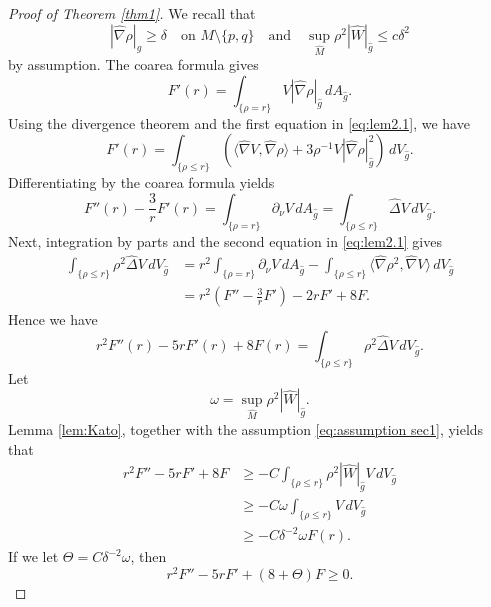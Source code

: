 \documentclass[10pt,a4paper]{amsart}
\newcommand{\da}{\,dA_{\widehat{g}}}
\newcommand{\dv}{\,dV_{\widehat{g}}}
\newcommand{\hd}{\widehat{\Delta}}
\newcommand{\hg}{\widehat{g}}
\newcommand{\hm}{\widehat{M}}
\newcommand{\hn}{\widehat{\nabla}}
\newcommand{\hw}{\widehat{W}}
\newcommand{\ls}{\{\rho=r\}}
\newcommand{\sls}{\{\rho\le r\}}
\begin{document}
\begin{proof}[Proof of Theorem \ref{thm1}] We recall that
\begin{equation*}
|\hn\rho|_{\hg}\ge\delta\quad\text{on $M\setminus\{p,q\}$}\quad \text{and}\quad \sup_{\hm}\rho^2|\hw|_{\hg}\le c\delta^2
\end{equation*} by assumption. The coarea formula gives 
\begin{equation*}
F'(r)=\int_{\ls}V|\hn\rho|_{\hg}\da.
\end{equation*}
Using the divergence theorem and the first equation in \eqref{eq:lem2.1}, we have
\begin{equation*}
F'(r)=\int_{\sls}\left(\langle\hn V,\hn\rho\rangle+3\rho^{-1}V|\hn\rho|^2_{\hg}\right)\dv.
\end{equation*}
Differentiating by the coarea formula yields 
\begin{equation*}
F''(r)-\frac{3}{r}F'(r)=\int_{\ls}\partial_\nu V\da=\int_{\sls}\hd V\dv.
\end{equation*}
Next, integration by parts and the second equation in \eqref{eq:lem2.1} gives
\begin{align*}
\int_{\sls}\rho^2\hd V\dv&=r^2\int_{\ls}\partial_\nu V\da-\int_{\sls}\langle\hn\rho^2, \hn V\rangle\dv\\
&=r^2\left(F''-\frac{3}{r}F'\right)-2rF'+8F.
\end{align*}
Hence we have
\begin{equation*}
r^2F''(r)-5rF'(r)+8F(r)=\int_{\sls}\rho^2\hd V\dv.
\end{equation*}
Let 
\begin{equation*}
\omega=\sup_{\hm}\rho^2|\hw|_{\hg}.
\end{equation*}
Lemma \ref{lem:Kato}, together with the assumption \eqref{eq:assumption sec1}, yields that 
\begin{align*}
r^2F''-5rF'+8F&\ge-C\int_{\sls}\rho^2|\hw|_{\hg}V\dv\\&\ge -C\omega\int_{\sls}V\dv\\
&\ge-C\delta^{-2}\omega F(r).
\end{align*}
If we let $\Theta=C\delta^{-2}\omega$, then
\begin{equation}\label{eq:ODE}
r^2F''-5rF'+(8+\Theta)F\ge0.
\end{equation}


\end{proof}
\end{document}
